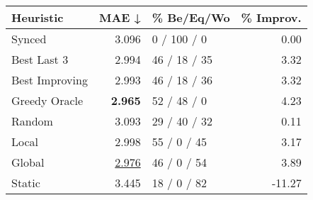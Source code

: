 \begin{tabular}{lrlr}
\toprule
\textbf{Heuristic} & \textbf{MAE ↓} & \textbf{\% Be/Eq/Wo} & \textbf{\% Improv.} \\
\midrule
            Synced &          3.096 &          0 / 100 / 0 &                0.00 \\
\midrule
       Best Last 3 &          2.994 &         46 / 18 / 35 &                3.32 \\
    Best Improving &          2.993 &         46 / 18 / 36 &                3.32 \\
\addlinespace
     Greedy Oracle &          \textbf{2.965} &          52 / 48 / 0 &                4.23 \\
            Random &          3.093 &         29 / 40 / 32 &                0.11 \\
\midrule
             Local &          2.998 &          55 / 0 / 45 &                3.17 \\
            Global &          \underline{2.976} &          46 / 0 / 54 &                3.89 \\
\midrule
            Static &          3.445 &          18 / 0 / 82 &              -11.27 \\
\bottomrule
\end{tabular}

\label{tab:ds_non_lr05_le1_bs4_Summary}
